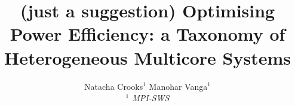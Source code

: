 

\newif \ifDraft\Drafttrue

\ifDraft
  \newcommand{\Comment}[1]{\textbf{\textsl{#1}}}
\else
  \newcommand{\Comment}[1]{\relax}
\fi

\newcommand{\gernot}[1]{\Comment{#1 [gernot]}}


\title{\textbf{
(just a suggestion) Optimising Power Efficiency: a Taxonomy of Heterogeneous Multicore Systems}
}

\author{
Natacha Crooks$^1$ \quad
Manohar Vanga$^1$
\\ \emph{$^1$ MPI-SWS}
}
\date{\vspace{-8pt}}




\maketitle





%
%



%
\fontsize{8}{8.2}
\selectfont


\normalsize

